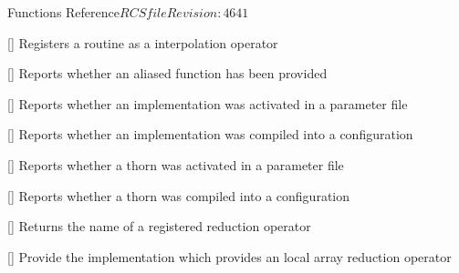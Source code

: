 \begin{cactuspart}{ Functions Reference}{$RCSfile$}{$Revision: 4641 $}
\begin{Lentry}


\item[\code{CCTK\_InterpRegisterOpLocalUniform}]
  [\pageref{CCTK-InterpRegisterOpLocalUniform}]
  Registers a routine as a 
  interpolation operator


\item[\code{CCTK\_IsFunctionAliased}]
  [\pageref{CCTK-IsFunctionAliased}]
  Reports whether an aliased function has been provided

\item[\code{CCTK\_IsImplementationActive}]
  [\pageref{CCTK-IsImplementationActive}]
  Reports whether an implementation was activated in a parameter file

\item[\code{CCTK\_IsImplementationCompiled}]
  [\pageref{CCTK-IsImplementationCompiled}]
  Reports whether an implementation was compiled into a configuration

\item[\code{CCTK\_IsThornActive}] [\pageref{CCTK-IsThornActive}]
  Reports whether a thorn was activated in a parameter file

\item[\code{CCTK\_IsThornCompiled}] [\pageref{CCTK-IsThornCompiled}]
  Reports whether a thorn was compiled into a configuration

\item[\code{CCTK\_LocalArrayReduceOperator}] [\pageref{CCTK-LocalArrayReduceOperator}]
  Returns the name of a registered reduction operator

\item[\code{CCTK\_LocalArrayReduceOperatorImplementation}] [\pageref{CCTK-LocalArrayReduceOperatorImplementation}]
  Provide the implementation which provides an local array reduction operator


\end{Lentry}
\end{cactuspart}
